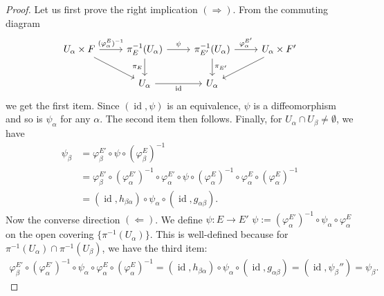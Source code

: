 \documentclass[10pt, a4paper]{article}
\newenvironment{noticeC}{%
  \tcolorbox[%
  notitle,
  empty,
  enhanced,  %
  breakable,
  coltext=black, 
  fontupper=\rmfamily,
  noparskip,
  sharp corners,
  boxrule=-1pt,  %
  frame hidden,
  left=7pt,  %
  right=7pt,
  top=5pt,
  bottom=5pt,
  before skip=2.5ex plus 2pt,
  after skip=2.5ex plus 2pt,
  overlay unbroken and last={%
  },
  ]}
{\endtcolorbox}
\newenvironment{myproof}%
  {\begin{noticeC}\begin{proof}}%
  {\end{proof}\end{noticeC}}
\DeclareMathOperator{\id}{id}
\begin{document}
\begin{myproof}
  Let us first prove the right implication $(\Rightarrow)$. From the commuting diagram 
  \[\begin{tikzcd}
    {U_\alpha \times F} & {\pi_E ^{-1} (U_\alpha)} & {\pi_{E'} ^{-1} (U_\alpha)} & {U_\alpha \times F'} \\
    & {U_\alpha} & {U_\alpha}
    \arrow["{(\varphi_\alpha ^E)^{-1}}", from=1-1, to=1-2]
    \arrow[from=1-1, to=2-2]
    \arrow["\psi", from=1-2, to=1-3]
    \arrow["{\pi_E}"', from=1-2, to=2-2]
    \arrow["{\varphi_\alpha ^{E'}}", from=1-3, to=1-4]
    \arrow["{\pi_{E'}}", from=1-3, to=2-3]
    \arrow[from=1-4, to=2-3]
    \arrow["\id"', from=2-2, to=2-3]
  \end{tikzcd}\]
  we get the first item. Since $(\id, \psi)$ is an equivalence, $\psi$ is a diffeomorphism and so is $\psi_\alpha$ for any $\alpha$.
  The second item then follows. Finally, for $U_\alpha \cap U_\beta \neq \emptyset$, we have 
  \begin{align*}
    \psi_\beta &= \varphi_\beta ^{E'} \circ \psi \circ (\varphi_\beta ^{E})^{-1}\\
    &= \varphi_\beta ^{E'} \circ (\varphi_\alpha ^{E'})^{-1} \circ \varphi_\alpha ^{E'} \circ \psi \circ (\varphi_\alpha ^{E})^{-1} \circ \varphi_\alpha ^{E} \circ (\varphi_\alpha ^{E})^{-1}\\
    &= (\id, h_{\beta \alpha}) \circ \psi_\alpha \circ (\id, g_{\alpha \beta}). 
  \end{align*}
  Now the converse direction $(\Leftarrow)$. We define $\psi: E \to E'$ 
  $\psi := (\varphi_\alpha ^{E'})^{-1} \circ \psi_\alpha \circ \varphi_\alpha ^{E}$ on the open covering $\{\pi^{-1} (U_\alpha)\}$.
  This is well-defined because for $\pi^{-1} (U_\alpha) \cap \pi^{-1} (U_\beta)$, we have the third item:
  \begin{align*}
    \varphi_\beta ^{E'} \circ (\varphi_\alpha ^{E'})^{-1} \circ \psi_\alpha \circ \varphi_\alpha ^{E} \circ (\varphi_\alpha ^{E})^{-1}
    = (\id, h_{\beta \alpha}) \circ \psi_\alpha \circ (\id, g_{\alpha \beta}) = (\id, \psi_{\beta} '') = \psi_\beta. 

\end{align*}
\end{myproof}
\end{document}
